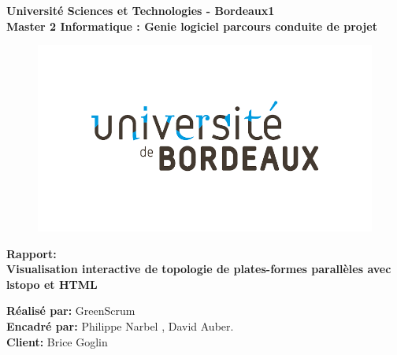 \documentclass [a4paper,11pt]{article}
\begin{document}
\begin{titlepage}
\begin{center}
{\bf Université Sciences et Technologies - Bordeaux1} \vspace{0.5cm}\\

{\bf {\large Master 2 Informatique : Genie logiciel parcours conduite de projet}}\\

\begin{figure}[!ht]
  \centering
  \includegraphics[scale=0.2]{img/uniBx-logo}

  \label{fig:logUniBx}
\end{figure}


{\large{\bf{Rapport:}}}\\\vspace{1cm}
{\huge{\bf Visualisation interactive de topologie de plates-formes parallèles avec lstopo et HTML}}\\\vspace{0.5cm}





\end{center}

\hspace{1cm}\textbf{Réalisé par:} GreenScrum \\

\hspace{1cm}\textbf{Encadré par:} Philippe Narbel , David Auber.\\


\hspace{1cm}\textbf{Client:} Brice Goglin\\



\end{titlepage}
\end{document}

